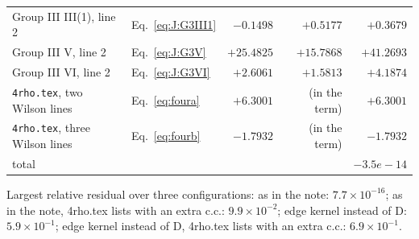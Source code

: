 \documentclass[10pt]{article}
\numberwithin{equation}{section}
\begin{document}
\begin{longtable}{@{}llrrr@{}}
Group III III(1), line 2 & Eq.~\eqref{eq:J:G3III1} & $-0.1498$ & $+0.5177$ & $+0.3679$\\
Group III V, line 2 & Eq.~\eqref{eq:J:G3V} & $+25.4825$ & $+15.7868$ & $+41.2693$\\
Group III VI, line 2 & Eq.~\eqref{eq:J:G3VI} & $+2.6061$ & $+1.5813$ & $+4.1874$\\
\texttt{4rho.tex}, two Wilson lines & Eq.~\eqref{eq:foura} & $+6.3001$ & (in the term) & $+6.3001$\\
\texttt{4rho.tex}, three Wilson lines & Eq.~\eqref{eq:fourb} & $-1.7932$ & (in the term) & $-1.7932$\\
\midrule
total & & & & $-3.5e-14$\\\bottomrule
\end{longtable}
\noindent Largest relative residual over three configurations: as in the note: $7.7\times10^{-16}$; as in the note, 4rho.tex lists with an extra c.c.: $9.9\times10^{-2}$; edge kernel instead of D: $5.9\times10^{-1}$; edge kernel instead of D, 4rho.tex lists with an extra c.c.: $6.9\times10^{-1}$.
\end{document}
